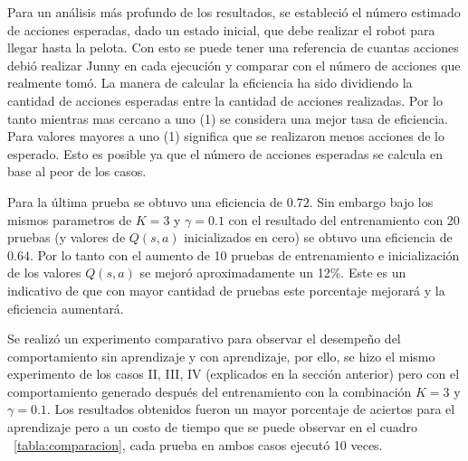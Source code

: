 Para un análisis más profundo de los resultados, se estableci\'o el n\'umero estimado de acciones esperadas, dado un estado inicial, que debe realizar el robot para llegar hasta la pelota. Con esto se puede tener una referencia de cuantas acciones debió realizar Junny en cada ejecución y comparar con el número de acciones que realmente tomó. La manera de calcular la eficiencia ha sido dividiendo la cantidad de acciones esperadas entre la cantidad de acciones realizadas. Por lo tanto mientras mas cercano a uno (1) se considera una mejor tasa de eficiencia. Para valores mayores a uno (1) significa que se realizaron menos acciones de lo esperado. Esto es posible ya que el número de acciones esperadas se calcula en base al peor de los casos.  

Para la última prueba se obtuvo una eficiencia de $0.72$. Sin embargo bajo los mismos parametros de $K = 3$ y $ \gamma = 0.1 $ con el resultado del entrenamiento con 20 pruebas (y valores de $Q(s,a)$ inicializados en cero) se obtuvo una eficiencia de $0.64$. Por lo tanto con el aumento de 10 pruebas de entrenamiento e inicialización de los valores $Q(s,a)$ se mejoró aproximadamente un 12\%. Este es un indicativo de que con mayor cantidad de pruebas este porcentaje mejorar\'a y la eficiencia aumentará.


Se realiz\'o un experimento comparativo para observar el desempe\~no del comportamiento sin aprendizaje y con aprendizaje, por ello, se hizo el mismo experimento de los casos II, III, IV (explicados en la sección anterior) pero con el comportamiento generado después del entrenamiento con la combinación $K = 3 $ y $ \gamma = 0.1$. Los resultados obtenidos fueron un mayor porcentaje de aciertos para el aprendizaje pero a un costo de tiempo que se puede observar en el cuadro ~\ref{tabla:comparacion}, cada prueba en ambos casos ejecut\'o 10 veces.

